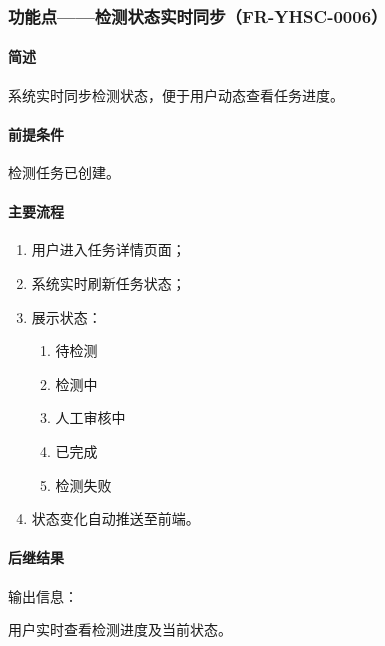 {\color{black}
\subsubsection{功能点——检测状态实时同步（FR-YHSC-0006）}

\paragraph*{简述}

系统实时同步检测状态，便于用户动态查看任务进度。

\paragraph*{前提条件}

检测任务已创建。

\paragraph*{主要流程}

\begin{enumerate}
    \item 用户进入任务详情页面；
    \item 系统实时刷新任务状态；
    \item 展示状态：
    \begin{enumerate}
        \item 待检测
        \item 检测中
        \item 人工审核中
        \item 已完成
        \item 检测失败
    \end{enumerate}
    \item 状态变化自动推送至前端。
\end{enumerate}

\paragraph*{后继结果}

输出信息：

用户实时查看检测进度及当前状态。
}
